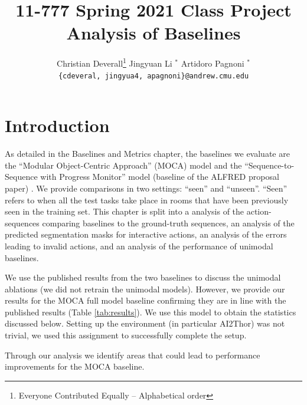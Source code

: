 \documentclass[11pt,a4paper]{article}
\title{11-777 Spring 2021 Class Project\\
Analysis of Baselines}
\author{
  Christian Deverall\thanks{\hspace{4pt}Everyone Contributed Equally -- Alphabetical order} \hspace{2em} Jingyuan Li $^*$ \hspace{2em} Artidoro Pagnoni $^*$ \\
  \texttt{\{cdeveral, jingyua4, apagnoni\}@andrew.cmu.edu}
  }
\date{}
\begin{document}
\maketitle


\section{Introduction}

As detailed in the Baselines and Metrics chapter, the baselines we evaluate are the ``Modular Object-Centric Approach'' (MOCA) \citep{singh2020moca} model and the ``Sequence-to-Sequence with Progress Monitor'' model (baseline of the ALFRED proposal paper) \citep{ALFRED20}. We provide comparisons in two settings: ``seen'' and ``unseen''. ``Seen'' refers to when all the test tasks take place in rooms that have been previously seen in the training set. This chapter is split into a analysis of the action-sequences comparing baselines to the ground-truth sequences, an analysis of the predicted segmentation masks for interactive actions, an analysis of the errors leading to invalid actions, and an analysis of the performance of unimodal baselines. 

We use the published results from the two baselines to discuss the unimodal ablations (we did not retrain the unimodal models). However, we provide our results for the MOCA full model baseline confirming they are in line with the published results (Table \ref{tab:results}). We use this model to obtain the statistics discussed below. Setting up the environment (in particular AI2Thor) was not trivial, we used this assignment to successfully complete the setup.

Through our analysis we identify areas that could lead to performance improvements for the MOCA baseline.

    
\end{document}
